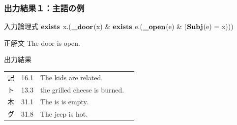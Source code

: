 \documentclass[dvipdfmx]{beamer}
\newcommand{\highlight}[3][38]{\tikz[baseline=(x.base)]{
 \node[rectangle,rounded corners,fill=#2!#1](x){#3};}}
\newcommand{\LF}[1]{\ensuremath{\texttt{\bf #1}}}
\begin{document}



\begin{frame}
\frametitle{出力結果１：主語の例}

\begin{block}{入力論理式}
  \LF{exists} x.(\LF{\_door}(x) \& \LF{exists} e.(\LF{\_open}(e) \& (\LF{Subj}(e) = x)))
\end{block}

\begin{block}{正解文}
  The door is open.
\end{block}

\begin{block}{出力結果}
\begin{table}[h]
\begin{tabular}{llll} \hline
記 & 16.1& The kids are related.\\
ト & 13.3 & the grilled cheese is burned.\\
木 & 31.1 & The is is empty.\\
グ & 31.8 & The jeep is hot.\\ \hline
\end{tabular}
\label{tab:example3}
\end{table}
\end{block}
\end{frame}
\end{document}
